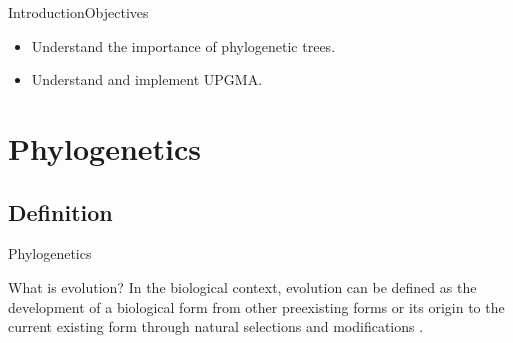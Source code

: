 \documentclass[10pt]{beamer}
\newcommand{\1}{
	\setbeamertemplate{background}{
		\texttt{[image: img/1]}
		\tikz[overlay] \fill[fill opacity=0.75,fill=white] (0,0) rectangle (-\paperwidth,\paperheight);
	}
}
\begin{document}
\begin{frame}{Introduction}{Objectives}
\begin{itemize}
    \item<1-> Understand the importance of phylogenetic trees. 
    \item<2-> Understand and implement UPGMA.
  \end{itemize}
\end{frame}


\section{Phylogenetics}

\subsection{Definition}

\begin{frame}{Phylogenetics}{}
	\begin{block}{What is evolution?}
		In the biological context, evolution can be defined as the development of a
		biological form from other preexisting forms or its origin to the current existing form
		through natural selections and modifications \cite{xiong2006essential}. 		
	\end{block}
\end{frame}
\end{document}
